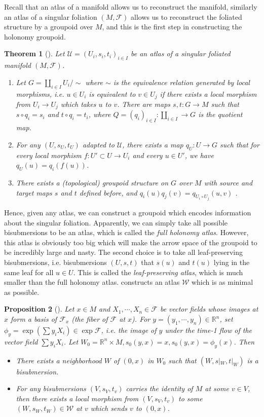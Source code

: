 \documentclass[12pt]{amsart}
\newtheorem{thm}{Theorem}[section]
\newtheorem{prop}[thm]{Proposition}
\theoremstyle{definition}
\theoremstyle{remark}
\numberwithin{equation}{section}
\newcommand{\CF}{{\mathcal F}}
\newcommand{\R}{{\mathbb{R}}}
\newcommand{\1}{{\mathbb{1}}}
\begin{document}
Recall that an atlas of a manifold allows us to reconstruct the manifold, similarly an atlas of a singular foliation $(M, \CF)$ allows us to reconstruct the foliated structure by a groupoid over $M$, and this is the first step in constructing the holonomy groupoid.
\begin{thm}[\cite{AS06}]
    Let $\mathcal{U} = (U_i, s_i, t_i)_{i\in I}$ be an atlas of a singular foliated manifold $(M, \CF)$.
    \begin{enumerate}
        \item Let $G = \coprod_{i\in I} U_i / \sim$ where $\sim$ is the equivalence relation generated by local morphisms, i.e. $u\in U_i $ is equivalent to $v\in U_j$ if there exists a local morphism from $U_i\to U_j$ which takes $u$ to $v$. There are maps $s,t: G \to M$ such that $s\circ q_i = s_i$ and $t\circ q_i = t_i$, where $Q= (q_i)_{i\in I}:\coprod_{i\in I}  \to G $ is the quotient map.
         \item For any $(U, s_U, t_U)$ adapted to $\mathcal{U}$, there exists a map $q_U: U\to G$ such that for every local morphism $f: U'\subset U \to U_i$ and every $u\in U'$, we have $q_U(u) = q_i(f(u))$.
         \item There exists a (topological) groupoid structure on $G$ over $M$ with source and target maps $s$ and $t$ defined before, and $q_i(u)q_j(v) = q_{U_i\circ U_j}(u,v)$ .
    \end{enumerate}
\end{thm}
Hence, given any atlas, we can construct a groupoid which encodes information about the singular foliation. Apparently, we can simply take all possible bisubmersions to be an atlas, which is called the {\it full holonomy atlas}. However, this atlas is obviously too big which will make the arrow space of the groupoid to be incredibly large and nasty. The second choice is to take all leaf-preserving bisubmersions, i.e. bisubmersions $(U,s,t)$ that $s(u)$ and $t(u)$ lying in the same leaf for all $u\in U$. This is called the {\it leaf-preserving atlas}, which is much smaller than the full holonomy atlas. \cite{AS06} constructs an atlas $\mathcal{W}$ which is as minimal as possible.  
\begin{prop}[\cite{AS06}]\label{pathhol}
    Let $x\in M$ and $X_1,\cdots, X_n\in \CF$ be vector fields whose images at $x$ form a basis of $\CF_x$ (the fiber of $\CF$ at $x$). For $y=(y_1,\cdots, y_n)\in \R^n$,  set $\phi_y = \exp(\sum y_i X_i)\in \exp \CF$, i.e.  the image of $y$ under the time-1 flow of the vector field $\sum y_i X_i$. Let $W_0 = \R^n \times M, s_0(y,x) = x, s_0(y,x) = \phi_y(x)$. Then
    \begin{itemize}
        \item There exists a neighborhood $W$ of $(0,x)$ in $W_0$ such that $(W, s|_W, t|_W)$ is a bisubmersion.
        \item For any bisubmersions  $(V,s_V, t_v)$ carries the identity of $M$ at some $v\in V$, then there exists a local morphism from  $(V,s_V, t_v)$ to some $(W, s_W, t_W)\in \mathcal{W}$ at $v$ which sends $v$ to $(0,x)$.
    \end{itemize}
\end{prop}
\end{document}
